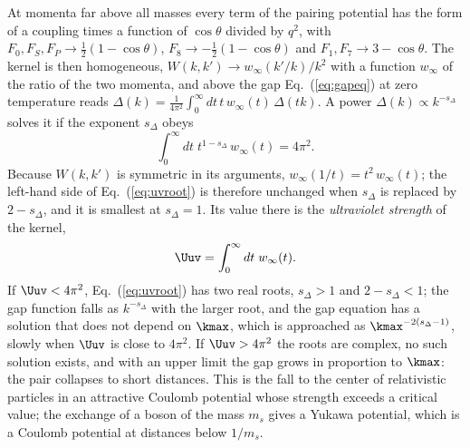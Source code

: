At momenta far above all masses every term of the pairing potential has the form of a coupling
times a function of $\cos\theta$ divided by $q^{2}$, with $F_0,F_S,F_P\to\tfrac12(1-\cos\theta)$,
$F_8\to-\tfrac12(1-\cos\theta)$ and $F_1,F_7\to3-\cos\theta$. The kernel is then homogeneous,
$W(k,k')\to w_\infty(k'/k)/k^{2}$ with a function $w_\infty$ of the ratio of the two momenta, and
above the gap Eq.~(\ref{eq:gapeq}) at zero temperature reads
$\Delta(k)=\tfrac1{4\pi^{2}}\int_0^\infty dt\,t\,w_\infty(t)\,\Delta(tk)$. A power
$\Delta(k)\propto k^{-s_\Delta}$ solves it if the exponent $s_\Delta$ obeys
\begin{equation}
\int_0^\infty dt\;t^{1-s_\Delta}\,w_\infty(t)=4\pi^{2} .
\label{eq:uvroot}
\end{equation}
Because $W(k,k')$ is symmetric in its arguments, $w_\infty(1/t)=t^{2}\,w_\infty(t)$; the left-hand
side of Eq.~(\ref{eq:uvroot}) is therefore unchanged when $s_\Delta$ is replaced by $2-s_\Delta$, and
it is smallest at $s_\Delta=1$. Its value there is the \emph{ultraviolet strength} of the kernel,
\begin{equation}
\Uuv=\int_0^\infty dt\;w_\infty(t).
\label{eq:Uuvdef}
\end{equation}
If $\Uuv<4\pi^{2}$, Eq.~(\ref{eq:uvroot}) has two real roots, $s_\Delta>1$ and $2-s_\Delta<1$; the gap
function falls as $k^{-s_\Delta}$ with the larger root, and the gap equation has a solution that
does not depend on $\kmax$, which is approached as $\kmax^{-2(s_\Delta-1)}$, slowly when $\Uuv$ is
close to $4\pi^{2}$. If $\Uuv>4\pi^{2}$ the roots are complex, no such solution exists, and with an
upper limit the gap grows in proportion to $\kmax$: the pair collapses to short distances. This is
the fall to the center of relativistic particles in an attractive Coulomb potential whose strength
exceeds a critical value; the exchange of a boson of the mass $m_s$ gives a Yukawa potential, which
is a Coulomb potential at distances below $1/m_s$.

